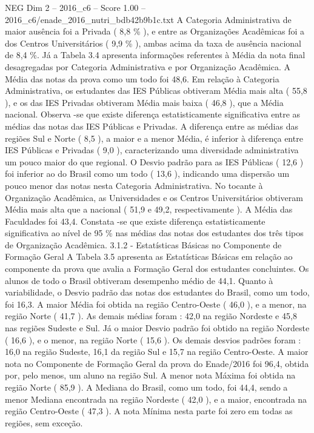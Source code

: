 \begin{textsample}{NEG Dim 2 – 2016\_c6 – Score 1.00 – 2016\_c6/enade\_2016\_nutri\_bdb42b9b1c.txt}
A Categoria Administrativa de maior ausência foi a Privada ( 8,8 \% ), e entre as Organizações Acadêmicas foi a dos Centros Universitários ( 9,9 \% ), ambas acima da taxa de ausência nacional de 8,4 \%.
Já a Tabela 3.4 apresenta informações referentes à Média da nota final desagregadas por Categoria Administrativa e por Organização Acadêmica.
A Média das notas da prova como um todo foi 48,6.
Em relação à Categoria Administrativa, os estudantes das IES Públicas obtiveram Média mais alta ( 55,8 ), e os das IES Privadas obtiveram Média mais baixa ( 46,8 ), que a Média nacional.
Observa -se que existe diferença estatisticamente significativa entre as médias das notas das IES Públicas e Privadas.
A diferença entre as médias das regiões Sul e Norte ( 8,5 ), a maior e a menor Média, é inferior à diferença entre IES Públicas e Privadas ( 9,0 ), caracterizando uma diversidade administrativa um pouco maior do que regional.
O Desvio padrão para as IES Públicas ( 12,6 ) foi inferior ao do Brasil como um todo ( 13,6 ), indicando uma dispersão um pouco menor das notas nesta Categoria Administrativa.
No tocante à Organização Acadêmica, as Universidades e os Centros Universitários obtiveram Média mais alta que a nacional ( 51,9 e 49,2, respectivamente ).
A Média das Faculdades foi 43,4.
Constata -se que existe diferença estatisticamente significativa ao nível de 95 \% nas médias das notas dos estudantes dos três tipos de Organização Acadêmica. 3.1.2 - Estatísticas Básicas no Componente de Formação Geral A Tabela 3.5 apresenta as Estatísticas Básicas em relação ao componente da prova que avalia a Formação Geral dos estudantes concluintes.
Os alunos de todo o Brasil obtiveram desempenho médio de 44,1.
Quanto à variabilidade, o Desvio padrão das notas dos estudantes do Brasil, como um todo, foi 16,3.
A maior Média foi obtida na região Centro-Oeste ( 46,0 ), e a menor, na região Norte ( 41,7 ).
As demais médias foram : 42,0 na região Nordeste e 45,8 nas regiões Sudeste e Sul.
Já o maior Desvio padrão foi obtido na região Nordeste ( 16,6 ), e o menor, na região Norte ( 15,6 ).
Os demais desvios padrões foram : 16,0 na região Sudeste, 16,1 da região Sul e 15,7 na região Centro-Oeste.
A maior nota no Componente de Formação Geral da prova do Enade/2016 foi 96,4, obtida por, pelo menos, um aluno na região Sul.
A menor nota Máxima foi obtida na região Norte ( 85,9 ).
A Mediana do Brasil, como um todo, foi 44,4, sendo a menor Mediana encontrada na região Nordeste ( 42,0 ), e a maior, encontrada na região Centro-Oeste ( 47,3 ).
A nota Mínima nesta parte foi zero em todas as regiões, sem exceção.

\end{textsample}

